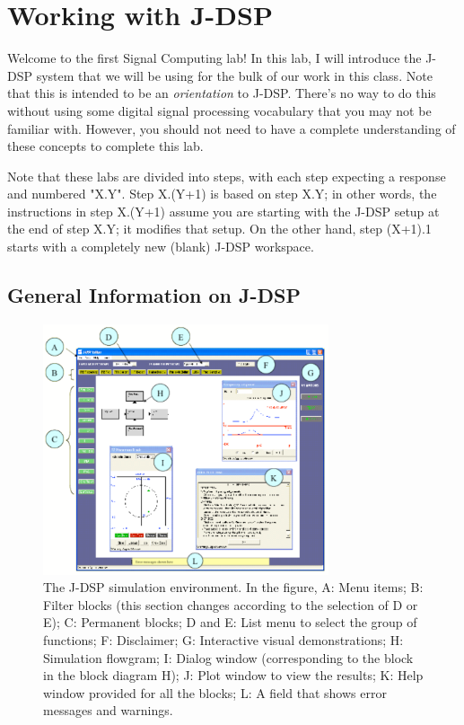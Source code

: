 
\section{Working with J-DSP}

Welcome to the first Signal Computing lab! In this lab, I will introduce the
J-DSP system that we will be using for the bulk of our work in this
class. 
Note that this is intended to be an
\emph{orientation} to J-DSP. There's no way to do this without using
some digital signal processing vocabulary that you may not be familiar
with. However, you should not need to have a complete understanding of
these concepts to complete this lab. 

Note that these labs are divided into steps, with each step expecting a
response and numbered "X.Y". Step X.(Y+1) is based on step X.Y; in other
words, the instructions in step X.(Y+1) assume you are starting with the
J-DSP setup at the end of step X.Y; it modifies that setup. On the other
hand, step (X+1).1 starts with a completely new (blank) J-DSP workspace.

\subsection{General Information on J-DSP}

\begin{figure}
\begin{center}
\includegraphics[width=0.75\textwidth]{lab1/simenv}
\end{center}
\caption{The J-DSP simulation environment. In the figure, A: Menu
  items; B: Filter blocks (this section changes according to the
  selection of D or E); C: Permanent blocks; D and E: List menu to
  select the group of functions; F: Disclaimer; G: Interactive visual
  demonstrations; H: Simulation flowgram; I: Dialog window
  (corresponding to the  block in the block
  diagram H); J: Plot window to view the results; K: Help window
  provided for all the blocks; L: A field that shows error messages
  and warnings.\label{fg:simenv}}
\end{figure}

